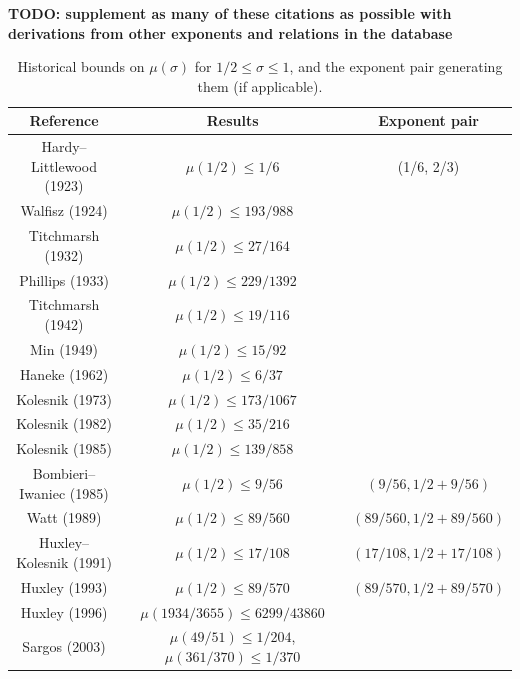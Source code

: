 \textbf{TODO: supplement as many of these citations as possible with derivations from other exponents and relations in the database}

\begin{table}[ht]
\caption{Historical bounds on $\mu(\sigma)$ for $1/2 \le \sigma \le 1$, and the exponent pair generating them (if applicable).}
\centering
\renewcommand{\arraystretch}{1.2}
\begin{tabular}{|c|c|c|}
\hline
Reference & Results & Exponent pair \\
\hline
Hardy--Littlewood (1923) \cite{hardy_littlewood_1923} & $\mu(1/2) \le 1/6$ & (1/6, 2/3)\\
\hline
Walfisz (1924) \cite{walfisz_1924} & $\mu(1/2) \le 193/988$ & \\
\hline
Titchmarsh (1932) \cite{titchmarsh_van_1931} & $\mu(1/2) \leq 27/164$ & \\
\hline
Phillips (1933) \cite{phillips_zeta_1933} & $\mu(1/2) \leq 229/1392$ & \\
\hline
Titchmarsh (1942) \cite{titchmarsh_order_1942}  & $\mu(1/2) \leq 19/116$ & \\
\hline
Min (1949) \cite{min_on_1949} & $\mu(1/2) \leq 15/92$ & \\
\hline
Haneke (1962) \cite{haneke_verscharfung_1963} & $\mu(1/2) \leq 6/37$&  \\
\hline
Kolesnik (1973) \cite{kolesnik_1973} & $\mu(1/2) \leq 173/1067$ & \\
\hline
Kolesnik (1982) \cite{kolesnik_order_1982} & $\mu(1/2) \leq 35/216$ & \\
\hline
Kolesnik (1985) \cite{kolesnik_1985} & $\mu(1/2) \leq 139/858$ & \\
\hline
Bombieri--Iwaniec (1985) \cite{bombieri_order_1986} & $\mu(1/2) \leq 9/56$ & $(9/56, 1/2+9/56)$\\
\hline
Watt (1989) \cite{watt_exponential_1989} & $\mu(1/2) \leq 89/560$ & $(89/560, 1/2+89/560)$\\
\hline
Huxley--Kolesnik (1991) \cite{huxley_exponential_1991} & $\mu(1/2) \leq 17/108$ & $(17/108, 1/2+17/108)$\\
\hline
Huxley (1993) \cite{huxley_exponential_1993} & $\mu(1/2) \leq 89/570$ & $(89/570, 1/2+89/570)$\\
\hline
Huxley (1996) \cite{huxley_area_1996} & $\mu(1934/3655) \leq 6299/43860$ & \\
\hline
Sargos (2003) \cite{sargos_analog_2003} & $\mu(49/51) \leq 1/204$, $\mu(361/370) \leq 1/370$&  \\

\end{tabular}
\end{table}
